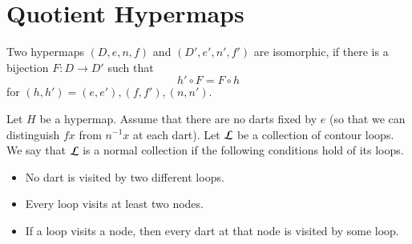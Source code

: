 %
%
%
%
%
%
%




\section{Quotient Hypermaps}


\begin{definition} Two hypermaps $(D,e,n,f)$ and $(D',e',n',f')$ are
isomorphic, if there is a bijection $F:D\to D'$ such that
    $$h'\circ F = F\circ h$$
for $(h,h')=(e,e'), (f,f'), (n,n')$.
\end{definition}


\begin{definition}
Let $H$ be a hypermap. Assume that 
there are no darts fixed by $e$ 
(so that we can distinguish $f x$
from $n^{-1} x$ at each dart). 
Let $\cal L$ be a collection of contour
loops.  We say that $\cal L$ is a normal collection if the following
conditions hold of its loops. \begin{itemize}
 \item No dart is visited by two different loops.
 \item Every loop visits at least two nodes.
 \item If a loop visits a node, then every dart at that node is
 visited by some loop.
\end{itemize}
\end{definition}

